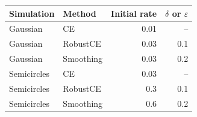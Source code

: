 \begin{tabular}{@{}llrr@{}}
\toprule
Simulation & Method & Initial rate & $\delta$ or $\varepsilon$ \\
\midrule
Gaussian & CE & 0.01 & -- \\
Gaussian & RobustCE & 0.03 & 0.1 \\
Gaussian & Smoothing & 0.03 & 0.2 \\
\addlinespace
Semicircles & CE & 0.03 & -- \\
Semicircles & RobustCE & 0.3 & 0.1 \\
Semicircles & Smoothing & 0.6 & 0.2 \\
\bottomrule
\end{tabular}
